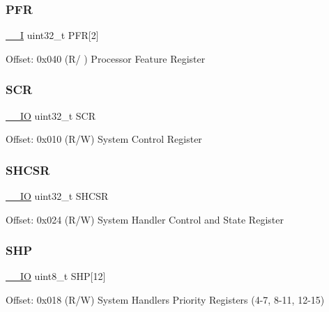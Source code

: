 \subsubsection{\texorpdfstring{P\+FR}{PFR}}
{\footnotesize\ttfamily \mbox{\hyperlink{core__cm3_8h_af63697ed9952cc71e1225efe205f6cd3}{\+\_\+\+\_\+I}} uint32\+\_\+t P\+FR\mbox{[}2\mbox{]}}

Offset\+: 0x040 (R/ ) Processor Feature Register \mbox{\label{struct_s_c_b___type_a64a95891ad3e904dd5548112539c1c98}} 
\subsubsection{\texorpdfstring{S\+CR}{SCR}}
{\footnotesize\ttfamily \mbox{\hyperlink{core__cm3_8h_aec43007d9998a0a0e01faede4133d6be}{\+\_\+\+\_\+\+IO}} uint32\+\_\+t S\+CR}

Offset\+: 0x010 (R/W) System Control Register \mbox{\label{struct_s_c_b___type_a04d136e5436e5fa2fb2aaa78a5f86b19}} 
\subsubsection{\texorpdfstring{S\+H\+C\+SR}{SHCSR}}
{\footnotesize\ttfamily \mbox{\hyperlink{core__cm3_8h_aec43007d9998a0a0e01faede4133d6be}{\+\_\+\+\_\+\+IO}} uint32\+\_\+t S\+H\+C\+SR}

Offset\+: 0x024 (R/W) System Handler Control and State Register \mbox{\label{struct_s_c_b___type_a17dc9f83c53cbf7fa249e79a2d2a43f8}} 
\subsubsection{\texorpdfstring{S\+HP}{SHP}}
{\footnotesize\ttfamily \mbox{\hyperlink{core__cm3_8h_aec43007d9998a0a0e01faede4133d6be}{\+\_\+\+\_\+\+IO}} uint8\+\_\+t S\+HP\mbox{[}12\mbox{]}}

Offset\+: 0x018 (R/W) System Handlers Priority Registers (4-\/7, 8-\/11, 12-\/15) \mbox{\label{struct_s_c_b___type_aaf388a921a016cae590cfcf1e43b1cdf}} 
